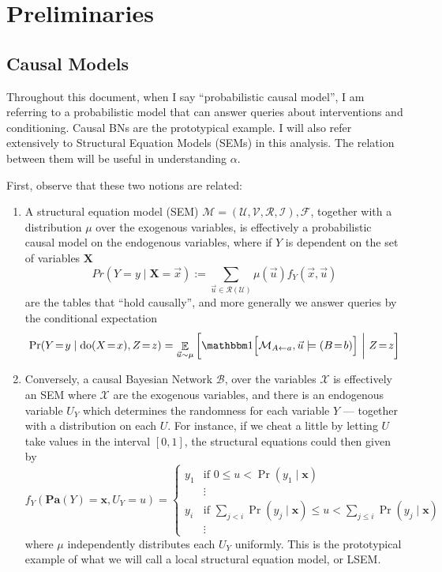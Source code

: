 \documentclass{article}
\newcommand{\E}{\mathop{\mathbb E}}
\newcommand\Pa{\mathbf{Pa}}
\theoremstyle{plain}
\theoremstyle{definition}
\theoremstyle{remark}
\newcommand{\cdo}{\mathop{\mathrm{do}}}
\begin{document}
\section{Preliminaries}
\subsection{Causal Models}

Throughout this document, when I say ``probabilistic causal model'', I am referring to a probabilistic model that can answer queries about interventions and conditioning. Causal BNs are the prototypical example. I will also refer extensively to Structural Equation Models (SEMs) in this analysis. The relation between them will be useful in understanding $\alpha$.

First, observe that these two notions are related:
\begin{enumerate}
\item A structural equation model (SEM) $\mathcal M = (\mathcal U, \mathcal V, \mathcal R, \mathcal I), \mathcal F$, together with a distribution $\mu$ over the exogenous variables, is effectively a probabilistic causal model on the endogenous variables, where if $Y$ is dependent on the set of variables $\mathbf X$
\[ Pr(Y = y \mid \mathbf X = \vec x) := \sum_{\vec u \in \mathcal R(\mathcal U)} \mu(\vec u) f_Y(\vec x, \vec u) \]
are the tables that ``hold causally'', and more generally we answer queries by the conditional expectation
\[ \Pr(Y\!=\!y \mid \cdo(X\!=\!x), Z\!=\!z) = \E_{\vec u \sim \mu}\bigg[ \mathbbm1\Big[ \mathcal M_{A \gets a}, \vec u\models (B\!=\!b) \Big]~\bigg|~Z\!=\!z\bigg] \]
\item Conversely, a causal Bayesian Network $\mathcal B$, over the variables $\mathcal X$ is effectively an SEM where $\mathcal X$ are the exogenous variables, and there is an endogenous variable $U_Y$ which determines the randomness for each variable $Y$ --- together with a distribution on each $U$. For instance, if we cheat a little by letting $U$ take values in the interval $[0,1]$, the structural equations could then given by 
\[ f_Y(\Pa(Y) = \mathbf x, U_Y = u) = \begin{cases}
	y_1 & \text{if }0 \leq u < \Pr(y_1\mid \mathbf x) \\
	&\vdots \\
	y_i & \text{if }\sum_{j < i} \Pr(y_j\mid \mathbf x) \leq u < \sum_{j \leq i} \Pr (y_j\mid \mathbf x)\\
	&\vdots
\end{cases} 
\]
where $\mu$ independently distributes each $U_Y$ uniformly.
This is the prototypical example of what we will call a local structural equation model, or LSEM.
\end{enumerate}
\end{document}
